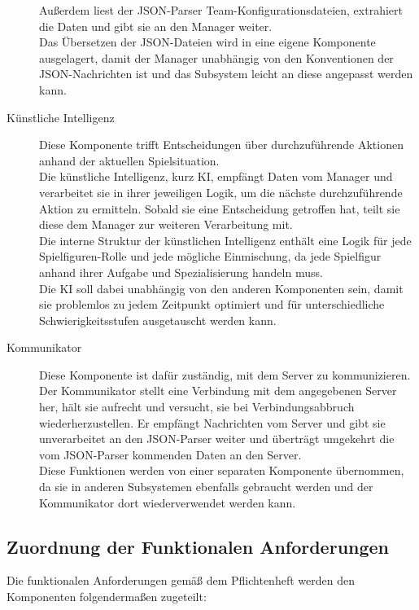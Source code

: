 \begin{description}
	Außerdem liest der JSON-Parser Team-Konfigurationsdateien, extrahiert die Daten und gibt sie an den Manager weiter.\\
	Das Übersetzen der JSON-Dateien wird in eine eigene Komponente ausgelagert, damit der Manager unabhängig von den Konventionen der JSON-Nachrichten ist und das Subsystem leicht an diese angepasst werden kann.
	\\
	\item[Künstliche Intelligenz] 
	Diese Komponente trifft Entscheidungen über durchzuführende Aktionen anhand der aktuellen Spielsituation.\\
	Die künstliche Intelligenz, kurz KI, empfängt Daten vom Manager und verarbeitet sie in ihrer jeweiligen Logik, um die nächste durchzuführende Aktion zu ermitteln. Sobald sie eine Entscheidung getroffen hat, teilt sie diese dem Manager zur weiteren Verarbeitung mit.\\
	Die interne Struktur der künstlichen Intelligenz enthält eine Logik für jede Spielfiguren-Rolle und jede mögliche Einmischung, da jede Spielfigur anhand ihrer Aufgabe und Spezialisierung handeln muss.\\
	Die KI soll dabei unabhängig von den anderen Komponenten sein, damit sie problemlos zu jedem Zeitpunkt optimiert und für unterschiedliche Schwierigkeitsstufen ausgetauscht werden kann.
	\\
	\item[Kommunikator]
	Diese Komponente ist dafür zuständig, mit dem Server zu kommunizieren.\\
	Der Kommunikator stellt eine Verbindung mit dem angegebenen Server her, hält sie aufrecht und versucht, sie bei Verbindungsabbruch wiederherzustellen. Er empfängt Nachrichten vom Server und gibt sie unverarbeitet an den JSON-Parser weiter und überträgt umgekehrt die vom JSON-Parser kommenden Daten an den Server.\\
	Diese Funktionen werden von einer separaten Komponente übernommen, da sie in anderen Subsystemen ebenfalls gebraucht werden und der Kommunikator dort wiederverwendet werden kann. 
\end{description}

\subsection{Zuordnung der Funktionalen Anforderungen}
Die funktionalen Anforderungen gemäß dem Pflichtenheft werden den Komponenten folgendermaßen zugeteilt:

